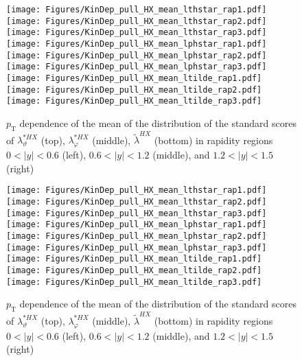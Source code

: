 \documentclass[12pt]{article}
\newcommand{\pT}{p_\mathrm{T}}
\newcommand{\absy}{\left |  y \right |}
\newcommand{\lamtildeHX}{\tilde{\lambda}^{\scriptscriptstyle HX}}
\newcommand{\lamthstarHX}{\lambda^{* \scriptscriptstyle HX}_\vartheta}
\newcommand{\lamphstarHX}{\lambda^{* \scriptscriptstyle HX}_\varphi}
\begin{document}
\begin{figure}[htbp]
\centering
\texttt{[image: Figures/KinDep\_pull\_HX\_mean\_lthstar\_rap1.pdf]}
\texttt{[image: Figures/KinDep\_pull\_HX\_mean\_lthstar\_rap2.pdf]}
\texttt{[image: Figures/KinDep\_pull\_HX\_mean\_lthstar\_rap3.pdf]}
\texttt{[image: Figures/KinDep\_pull\_HX\_mean\_lphstar\_rap1.pdf]}
\texttt{[image: Figures/KinDep\_pull\_HX\_mean\_lphstar\_rap2.pdf]}
\texttt{[image: Figures/KinDep\_pull\_HX\_mean\_lphstar\_rap3.pdf]}
\texttt{[image: Figures/KinDep\_pull\_HX\_mean\_ltilde\_rap1.pdf]}
\texttt{[image: Figures/KinDep\_pull\_HX\_mean\_ltilde\_rap2.pdf]}
\texttt{[image: Figures/KinDep\_pull\_HX\_mean\_ltilde\_rap3.pdf]}
\caption{$\pT$ dependence of the mean of the distribution of the standard scores
of $\lamthstarHX$ (top), $\lamphstarHX$ (middle), $\lamtildeHX$ (bottom) in rapidity
regions $0<\absy<0.6$ (left), $0.6<\absy<1.2$ (middle), and $1.2<\absy<1.5$ (right)}
\end{figure}
\clearpage


\begin{figure}[htbp]
\centering
\texttt{[image: Figures/KinDep\_pull\_HX\_mean\_lthstar\_rap1.pdf]}
\texttt{[image: Figures/KinDep\_pull\_HX\_mean\_lthstar\_rap2.pdf]}
\texttt{[image: Figures/KinDep\_pull\_HX\_mean\_lthstar\_rap3.pdf]}
\texttt{[image: Figures/KinDep\_pull\_HX\_mean\_lphstar\_rap1.pdf]}
\texttt{[image: Figures/KinDep\_pull\_HX\_mean\_lphstar\_rap2.pdf]}
\texttt{[image: Figures/KinDep\_pull\_HX\_mean\_lphstar\_rap3.pdf]}
\texttt{[image: Figures/KinDep\_pull\_HX\_mean\_ltilde\_rap1.pdf]}
\texttt{[image: Figures/KinDep\_pull\_HX\_mean\_ltilde\_rap2.pdf]}
\texttt{[image: Figures/KinDep\_pull\_HX\_mean\_ltilde\_rap3.pdf]}
\caption{$\pT$ dependence of the mean of the distribution of the standard scores
of $\lamthstarHX$ (top), $\lamphstarHX$ (middle), $\lamtildeHX$ (bottom) in rapidity
regions $0<\absy<0.6$ (left), $0.6<\absy<1.2$ (middle), and $1.2<\absy<1.5$ (right)}
\end{figure}
\clearpage
\end{document}
